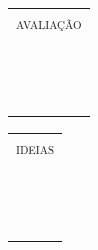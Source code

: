 {\begin{table}[b!]
    \begin{minipage}{.5\linewidth}
      \centering
        \begin{tabularx}{0.99\textwidth}{|Y|}
\hline
\textsc{avaliação} \\ 
 \\
 \\
 \\
 \\
 \\
 \\
 \\
 \\
 \\
 \\
 \\
 \\
 \\ \hline
        \end{tabularx}
    \end{minipage}%
    \begin{minipage}{.5\linewidth}
      \centering
        \begin{tabularx}{0.99\textwidth}{|Y|}
\hline
\textsc{ideias} \\
 \\
 \\
 \\
 \\
 \\
 \\
 \\
 \\
 \\
 \\
 \\
 \\
 \\ \hline
        \end{tabularx}
    \end{minipage} 
\end{table}
}

\newcommand{\WritingLines}{%
\begin{figure}[b!]
  \parbox[t][\paperheight]{\paperwidth}{
    \begin{tikzpicture}[overlay]
      \foreach \i in {-0.31, -0.91, ..., -23.5}{\draw [gray, thin]
        (-3cm,\i) -- (17cm,\i);}
    \end{tikzpicture}}
\end{figure}
}

\newcommand\hugetitle{\fontsize{55}{0}\selectfont}
\newcommand\largetitle{\fontsize{30}{0}\selectfont}
\newcommand\hugenumber{\fontsize{150}{160}\selectfont}
\newcommand\largenumber{\fontsize{40}{0}\selectfont}
\newcommand\hugechapter{\fontsize{70}{80}\selectfont}
\newcommand\largechapter{\fontsize{25}{30}\selectfont}


